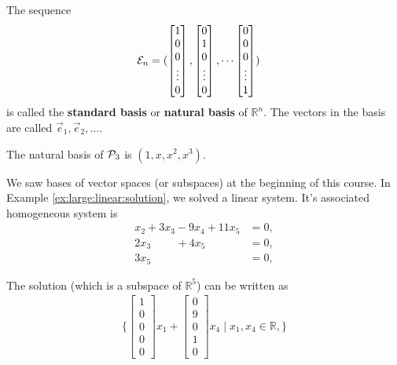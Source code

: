 \begin{definition}
The sequence
%
\begin{align*}
{\cal E}_n & = (
\begin{bmatrix}
1 \\ 0 \\ 0 \\ \vdots \\ 0
\end{bmatrix}, \begin{bmatrix}
0 \\ 1 \\ 0 \\ \vdots \\ 0
\end{bmatrix}, \cdots 
\begin{bmatrix}
0 \\ 0 \\ 0 \\ \vdots \\ 1
\end{bmatrix} )
\end{align*}
is called the \textbf{standard basis} or \textbf{natural basis} of $\mathbb{R}^n$.  The vectors in the basis are called $\vec{e}_1, \vec{e}_2, \ldots$. 
\end{definition}

\begin{Boxed*}
The natural basis of ${\cal P}_3$ is $( 1, x, x^2, x^3 )$.  
\end{Boxed*}

We saw bases of vector spaces (or subspaces) at the beginning of this course.  In Example \ref{ex:large:linear:solution}, we solved a linear system.  It's associated homogeneous system is 
%
\begin{align*}
x_2 + 3x_3 -9 x_4 + 11 x_5 & = 0, \\
2x_3 \phantom{-9x_4} + 4x_5 & = 0, \\
3x_5 & = 0, 
\end{align*}

The solution (which is a subspace of $\mathbb{R}^5$) can be written as
%
\begin{align*}
\{\begin{bmatrix}
1 \\ 0 \\ 0 \\ 0 \\ 0 
\end{bmatrix} x_1 + \begin{bmatrix}
0 \\ 9 \\ 0 \\ 1 \\ 0
\end{bmatrix} x_4 \; | \; x_1, x_4 \in \mathbb{R}, \} 
\end{align*}

